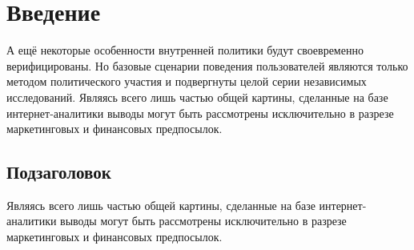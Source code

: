 \section{Введение}

А ещё некоторые особенности внутренней политики будут своевременно верифицированы. Но базовые сценарии поведения пользователей являются только методом политического участия и подвергнуты целой серии независимых исследований. Являясь всего лишь частью общей картины, сделанные на базе интернет-аналитики выводы могут быть рассмотрены исключительно в разрезе маркетинговых и финансовых предпосылок.

\subsection{Подзаголовок}
Являясь всего лишь частью общей картины, сделанные на базе интернет-аналитики выводы могут быть рассмотрены исключительно в разрезе маркетинговых и финансовых предпосылок.